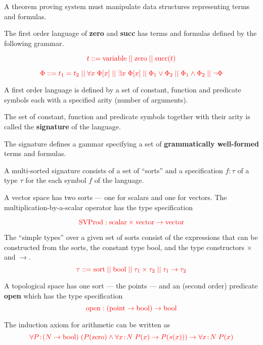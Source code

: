 {

A theorem proving system must manipulate data structures representing terms and formulas.

\vfill
The first order language  of {\bf zero} and {\bf succ} has terms and formulas
defined by the following grammar.

$${\color{red} t
::= \mathrm{variable} \;||\; \mathrm{zero} \;||\; \mathrm{succ}(t)}$$

$${\color{red} \Phi ::= t_1=t_2 \;||\; \forall x\; \Phi[x] \;||\; \exists x\; \Phi[x] \;||\; \Phi_1 \vee \Phi_2 \;||\; \Phi_1 \wedge \Phi_2 \;||\; \neg \Phi}$$



A first order language is defined by a set of constant, function and predicate symbols each with a specified
arity (number of arguments).

\vfill
The set of constant, function and predicate symbols together with their arity is called the {\bf signature} of the language.

\vfill
The signature defines a gammar specifying a set of {\bf grammatically well-formed} terms and formulas.


{\huge
A multi-sorted signature consists of a set of ``sorts'' and a specification $f\!:\!\tau$ of a type $\tau$ for the each symbol $f$ of the language.

\vfill
A vector space has two sorts --- one for scalars and one for vectors.
The multiplication-by-a-scalar operator has the type specification

$${\color{red}\mathrm{SVProd}: \mathrm{scalar} \times \mathrm{vector} \rightarrow \mathrm{vector}}$$
}


The ``simple types'' over a given set of sorts consist of the expressions that can be constructed from the sorts, the constant type bool, and
the type constructors $\times$ and $\rightarrow$.
$${\color{red} \tau ::= \mathrm{sort} \;||\; \mathrm{bool} \;||\; \tau_1 \times \tau_2 \;||\; \tau_1 \rightarrow \tau_2}$$


\vfill
A topological space has one sort --- the points --- and an (second order) predicate {\bf open} which has the type specification
$${\color{red}\mathrm{open}:(\mathrm{point}\rightarrow\mathrm{bool})\rightarrow\mathrm{bool}}$$

\vfill
The induction axiom for arithmetic can be written as
$${\color{red}\forall P\!:\!\left(N\rightarrow\mathrm{bool})\;(P(\mathrm{zero}) \wedge \forall x\!:\!N\;P(x)\rightarrow P(s(x))\right) \rightarrow \forall x\!:\!N \;P(x)}$$

}
